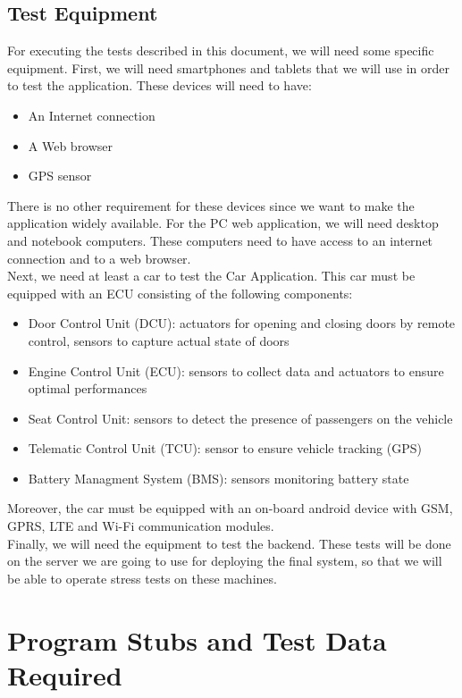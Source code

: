 \documentclass{article}
\begin{document}
\subsection{Test Equipment}
For executing the tests described in this document, we will need some specific equipment. First, we will need smartphones and tablets that we will use in order to test the application. These devices will need to have:
\begin{itemize}[noitemsep]
\item An Internet connection
\item A Web browser
\item GPS sensor
\end{itemize}
There is no other requirement for these devices since we want to make the application widely available.
For the PC web application, we will need desktop and notebook computers. These computers need to have access to an internet connection and to a web browser.
\\

Next, we need at least a car to test the Car Application. This car must be equipped with an ECU consisting of the following components:
\begin{itemize}[noitemsep]
\item Door Control Unit (DCU): actuators for opening and closing doors by remote control, sensors to capture actual state of doors
\item Engine Control Unit (ECU): sensors to collect data and actuators to ensure optimal performances
\item Seat Control Unit: sensors to detect the presence of passengers on the vehicle
\item Telematic Control Unit (TCU): sensor to ensure vehicle tracking (GPS)
\item Battery Managment System (BMS): sensors monitoring battery state
\end{itemize}
Moreover, the car must be equipped with an on-board android device with GSM, GPRS, LTE and Wi-Fi communication modules.
\\

Finally, we will need the equipment to test the backend. These tests will be done on the server we are going to use for deploying the final system, so that we will be able to operate stress tests on these machines.
\newpage
\section{Program Stubs and Test Data Required}
\end{document}
